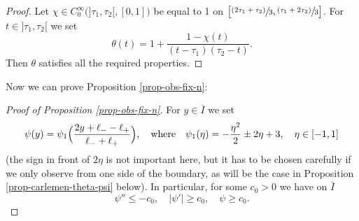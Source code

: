 \documentclass[11pt]{article}
\numberwithin{equation}{section}
\newcommand{\psfrac}[2]{\sfrac{(#1)}{#2}}
\theoremstyle{plain}
\theoremstyle{definition}
\newcommand{\abs}[1]{\vert #1\vert}
\newcommand{\1}{\mathds 1}
\begin{document}
\begin{proof}
Let $\chi \in C_0^\infty \bigl(]\tau_1,\tau_2[,[0,1] \bigr)$ be equal to 1 on $\big[\psfrac{2\tau_1 + \tau_2}{3},\psfrac{\tau_1 + 2\tau_2}{3} \big]$. For $t \in{}]\tau_1,\tau_2[$ we set
\[
\theta (t) = 1 + \frac{1 - \chi(t)}{(t-\tau_1)(\tau_2-t)}.
\]
Then $\theta$ satisfies all the required properties.
\end{proof}

Now we can prove Proposition \ref{prop-obs-fix-n}:

\begin{proof}[Proof of Proposition \ref{prop-obs-fix-n}]
For $y \in \bar I$ we set
\[
\psi(y) = \psi_1 \Bigl(\frac {2y + \ell_- - \ell_+}{\ell_- + \ell_+} \Bigr), \quad \text{where} \quad \psi_1(\eta) = - \frac {\eta^2} 2 \pm 2 \eta + 3, \quad \eta\in[-1,1]
\]
(the sign in front of $2\eta$ is not important here, but it has to be chosen carefully if we only observe from one side of the boundary, as will be the case in Proposition \ref{prop-carlemen-theta-psi} below).
In particular, for some $c_0 > 0$ we have on $\bar I$
\begin{equation} \label{eq-prop-psi}
\psi'' \leq - c_0, \quad \abs{\psi'} \geq c_0, \quad \psi \geq c_0.
\end{equation}


\end{proof}
\end{document}
